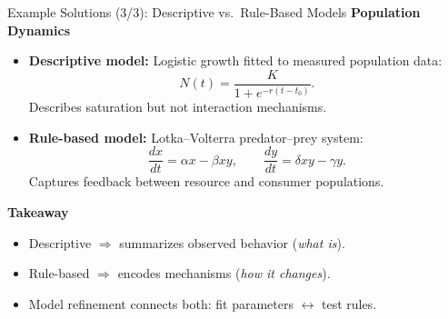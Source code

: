 \documentclass{beamer}
\begin{document}
\begin{frame}{Example Solutions (3/3): Descriptive vs.\ Rule-Based Models}
\tiny
\textbf{Population Dynamics}
\begin{itemize}
    \item \textbf{Descriptive model:}
          Logistic growth fitted to measured population data:
          \[
          N(t) = \frac{K}{1 + e^{-r(t - t_0)}}.
          \]
          Describes saturation but not interaction mechanisms.

    \item \textbf{Rule-based model:}
          Lotka--Volterra predator–prey system:
          \[
          \frac{dx}{dt} = \alpha x - \beta x y, \qquad
          \frac{dy}{dt} = \delta x y - \gamma y.
          \]
          Captures feedback between resource and consumer populations.
\end{itemize}

\vspace{1em}
\textbf{Takeaway}
\begin{itemize}
    \item Descriptive $\Rightarrow$ summarizes observed behavior (\emph{what is}).
    \item Rule-based $\Rightarrow$ encodes mechanisms (\emph{how it changes}).
    \item Model refinement connects both: fit parameters $\leftrightarrow$ test rules.
\end{itemize}

\end{frame}
\end{document}
